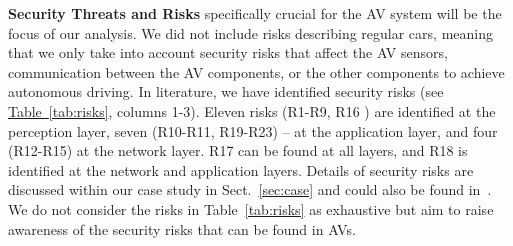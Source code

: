 \documentclass[runningheads]{llncs}
\begin{document}
\textbf{Security Threats and Risks} specifically crucial for the AV system will be the focus of our analysis. We did not include risks describing regular cars, meaning that we only take into account security risks that affect the AV sensors, communication between the AV components, or the other components to achieve autonomous driving.
%
In literature, we have identified security risks (see \hyperref[tab:risks]{Table~\ref{tab:risks}}, columns 1-3). Eleven risks (R1-R9, R16 %
) are identified at the perception layer, seven (R10-R11, R19-R23) -- at the application layer, and four (R12-R15) at the network layer. R17 can be found at all layers, and R18 is identified at the network and application layers. Details of security risks are discussed within our case study in Sect.~\ref{sec:case} and could also be found in~\cite{Rando2020}. We do not consider the risks in Table~\ref{tab:risks} as exhaustive but aim to raise awareness of the security risks that can be found in AVs.
\end{document}
